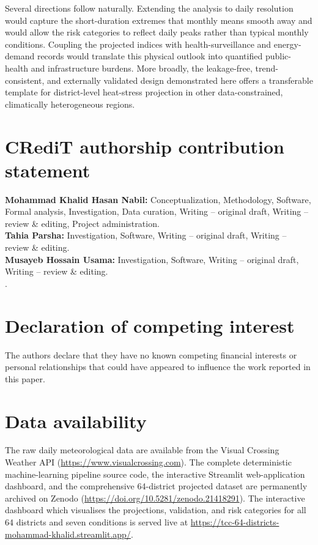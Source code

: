 \documentclass[review,11pt]{elsarticle}
\begin{document}
Several directions follow naturally. Extending the analysis to daily resolution
would capture the short-duration extremes that monthly means smooth away and would
allow the risk categories to reflect daily peaks rather than typical monthly
conditions. Coupling the projected indices with health-surveillance and
energy-demand records would translate this physical outlook into quantified
public-health and infrastructure burdens. More broadly, the leakage-free,
trend-consistent, and externally validated design demonstrated here offers a
transferable template for district-level heat-stress projection in other
data-constrained, climatically heterogeneous regions.

\section*{CRediT authorship contribution statement}
\noindent\textbf{Mohammad Khalid Hasan Nabil:} Conceptualization, Methodology, Software, Formal analysis, Investigation, Data curation, Writing -- original
draft, Writing -- review \& editing, Project administration.\\[2pt]
\textbf{Tahia Parsha:} Investigation, Software, Writing -- original draft, Writing -- review \& editing.\\[2pt]
\textbf{Musayeb Hossain Usama:} Investigation, Software, Writing -- original draft, Writing -- review \& editing.\\[2pt]. 

\section*{Declaration of competing interest}
The authors declare that they have no known competing financial interests or
personal relationships that could have appeared to influence the work reported in
this paper.

\section*{Data availability}
The raw daily meteorological data are available from the Visual Crossing Weather
API (\url{https://www.visualcrossing.com}). The complete deterministic
machine-learning pipeline source code, the interactive Streamlit web-application
dashboard, and the comprehensive 64-district projected dataset are permanently
archived on Zenodo (\url{https://doi.org/10.5281/zenodo.21418291}). The
interactive dashboard which visualises the projections, validation, and risk
categories for all 64 districts and seven conditions is served live at
\url{https://tcc-64-districts-mohammad-khalid.streamlit.app/}.
\end{document}
